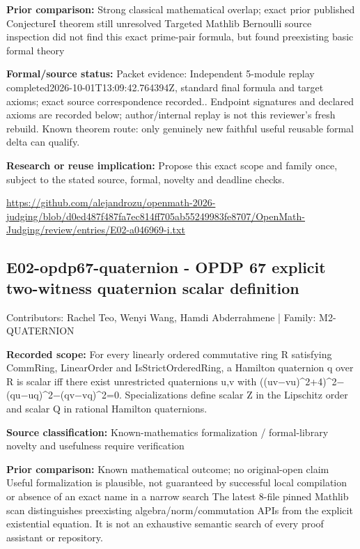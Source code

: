 \documentclass[11pt,a4paper]{article}
\begin{document}
\textbf{Prior comparison:} Strong classical mathematical overlap; exact prior published ConjectureI theorem still unresolved Targeted Mathlib Bernoulli source inspection did not find this exact prime-pair formula, but found preexisting basic formal theory

\textbf{Formal/source status:} Packet evidence: Independent 5-module replay completed2026-10-01T13:09:42.764394Z, standard final formula and target axioms; exact source correspondence recorded.. Endpoint signatures and declared axioms are recorded below; author/internal replay is not this reviewer's fresh rebuild. Known theorem route: only genuinely new faithful useful reusable formal delta can qualify.

\textbf{Research or reuse implication:} Propose this exact scope and family once, subject to the stated source, formal, novelty and deadline checks.

{\small \url{https://github.com/alejandrozu/openmath-2026-judging/blob/d0ed487f487fa7ec814ff705ab55249983fe8707/OpenMath-Judging/review/entries/E02-a046969-i.txt}\par}

\begin{samepage}
\subsection{E02-opdp67-quaternion  -  OPDP 67 explicit two-witness quaternion scalar definition}
{\small Contributors: Rachel Teo, Wenyi Wang, Hamdi Abderrahmene | Family: M2-QUATERNION\par}

\textbf{Recorded scope:} For every linearly ordered commutative ring R satisfying CommRing, LinearOrder and IsStrictOrderedRing, a Hamilton quaternion q over R is scalar iff there exist unrestricted quaternions u,v with ((uv\ensuremath{-}vu)\textasciicircum{}2+4)\textasciicircum{}2\ensuremath{-}(qu\ensuremath{-}uq)\textasciicircum{}2\ensuremath{-}(qv\ensuremath{-}vq)\textasciicircum{}2=0. Specializations define scalar Z in the Lipschitz order and scalar Q in rational Hamilton quaternions.

\end{samepage}
\textbf{Source classification:} Known-mathematics formalization / formal-library novelty and usefulness require verification

\textbf{Prior comparison:} Known mathematical outcome; no original-open claim Useful formalization is plausible, not guaranteed by successful local compilation or absence of an exact name in a narrow search The latest 8-file pinned Mathlib scan distinguishes preexisting algebra/norm/commutation APIs from the explicit existential equation. It is not an exhaustive semantic search of every proof assistant or repository.
\end{document}
